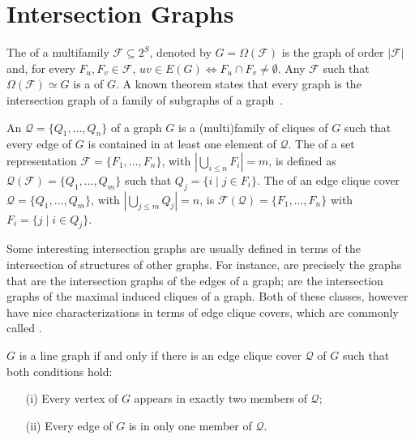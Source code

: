 \section{Intersection Graphs}
\label{sec:intersections}

The  of a multifamily $\mathcal{F} \subseteq 2^S$, denoted by $G = \Omega(\mathcal{F})$ is the graph of order $|\mathcal{F}|$ and, for every $F_u, F_v \in \mathcal{F}$, $uv \in E(G) \Leftrightarrow F_u \cap F_v \neq \emptyset$.
Any $\mathcal{F}$ such that $\Omega(\mathcal{F}) \simeq G$ is a  of $G$.
A known theorem states that every graph is the intersection graph of a family of subgraphs of a graph~\citep{intersection_graphs}.

An  $\mathcal{Q} = \{Q_1, \dots, Q_n\}$ of a graph $G$ is a (multi)family of cliques of $G$ such that every edge of $G$ is contained in at least one element of $\mathcal{Q}$.
The  of a set representation $\mathcal{F} = \{F_1, \dots, F_n\}$, with $|\bigcup_{i \leq n} F_i| = m$, is defined as $\mathcal{Q}(\mathcal{F}) = \{Q_1, \dots, Q_m\}$ such that $Q_j = \{i \mid j \in F_i\}$.
The  of an edge clique cover $\mathcal{Q} = \{Q_1, \dots, Q_m\}$, with $|\bigcup_{j \leq m} Q_j| = n$, is $\mathcal{F}(\mathcal{Q}) = \{F_1, \dots, F_n\}$ with $F_i = \{j \mid i \in Q_j\}$.

Some interesting intersection graphs are usually defined in terms of the intersection of structures of other graphs. For instance,  are precisely the graphs that are the intersection graphs of the edges of a graph;  are the intersection graphs of the maximal induced cliques of a graph.
Both of these classes, however have nice characterizations in terms of edge clique covers, which are commonly called .

\begin{class_definition*}
    $G$ is a line graph if and only if there is an edge clique cover $\mathcal{Q}$ of $G$ such that both conditions hold:
        \begin{itemize}
            \item[(i)] Every vertex of $G$ appears in exactly two members of $\mathcal{Q}$;
            \item[(ii)] Every edge of $G$ is in only one member of $\mathcal{Q}$.
        \end{itemize}
\end{class_definition*}

